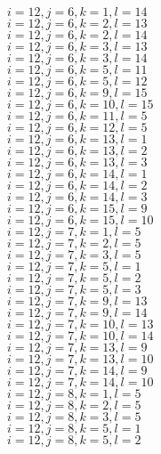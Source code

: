 \documentclass[14pt]{article}
\begin{document}
    $i=12,j=6,k=1,l=14 $ \\ 
    $i=12,j=6,k=2,l=13 $ \\ 
    $i=12,j=6,k=2,l=14 $ \\ 
    $i=12,j=6,k=3,l=13 $ \\ 
    $i=12,j=6,k=3,l=14 $ \\ 
    $i=12,j=6,k=5,l=11 $ \\ 
    $i=12,j=6,k=5,l=12 $ \\ 
    $i=12,j=6,k=9,l=15 $ \\ 
    $i=12,j=6,k=10,l=15 $ \\ 
    $i=12,j=6,k=11,l=5 $ \\ 
    $i=12,j=6,k=12,l=5 $ \\ 
    $i=12,j=6,k=13,l=1 $ \\ 
    $i=12,j=6,k=13,l=2 $ \\ 
    $i=12,j=6,k=13,l=3 $ \\ 
    $i=12,j=6,k=14,l=1 $ \\ 
    $i=12,j=6,k=14,l=2 $ \\ 
    $i=12,j=6,k=14,l=3 $ \\ 
    $i=12,j=6,k=15,l=9 $ \\ 
    $i=12,j=6,k=15,l=10 $ \\ 
    $i=12,j=7,k=1,l=5 $ \\ 
    $i=12,j=7,k=2,l=5 $ \\ 
    $i=12,j=7,k=3,l=5 $ \\ 
    $i=12,j=7,k=5,l=1 $ \\ 
    $i=12,j=7,k=5,l=2 $ \\ 
    $i=12,j=7,k=5,l=3 $ \\ 
    $i=12,j=7,k=9,l=13 $ \\ 
    $i=12,j=7,k=9,l=14 $ \\ 
    $i=12,j=7,k=10,l=13 $ \\ 
    $i=12,j=7,k=10,l=14 $ \\ 
    $i=12,j=7,k=13,l=9 $ \\ 
    $i=12,j=7,k=13,l=10 $ \\ 
    $i=12,j=7,k=14,l=9 $ \\ 
    $i=12,j=7,k=14,l=10 $ \\ 
    $i=12,j=8,k=1,l=5 $ \\ 
    $i=12,j=8,k=2,l=5 $ \\ 
    $i=12,j=8,k=3,l=5 $ \\ 
    $i=12,j=8,k=5,l=1 $ \\ 
    $i=12,j=8,k=5,l=2 $ \\ 
\end{document}
